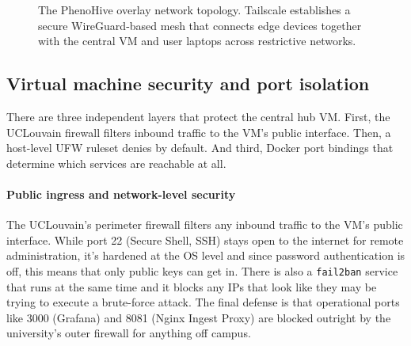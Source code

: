\begin{figure}[H]
\centering
{}
\caption[PhenoHive Overlay Network Topology]{The PhenoHive overlay network topology. Tailscale establishes a secure WireGuard-based mesh that connects edge devices together with the central VM and user laptops across restrictive networks.}
\label{fig:network-topology}
\end{figure}

\subsection{Virtual machine security and port isolation}

There are three independent layers that protect the central hub VM. First, the UCLouvain firewall filters inbound traffic to the VM's public interface. Then, a host-level UFW ruleset denies by default. And third, Docker port bindings that determine which services are reachable at all.

\paragraph{Public ingress and network-level security}
The UCLouvain's perimeter firewall filters any inbound traffic to the VM's public interface. While port 22 (Secure Shell, SSH) stays open to the internet for remote administration, it's hardened at the OS level and since password authentication is off, this means that only public keys can get in. There is also a \texttt{fail2ban} service that runs at the same time and it blocks any IPs that look like they may be trying to execute a  brute-force attack. The final defense is that operational ports like 3000 (Grafana) and 8081 (Nginx Ingest Proxy) are blocked outright by the university's outer firewall for anything off campus.


